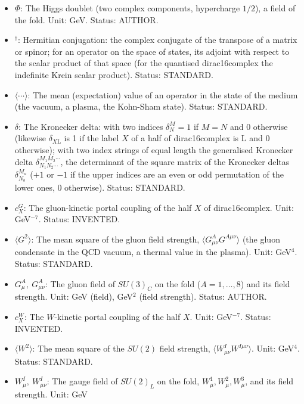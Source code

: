 \documentclass[
  10pt,
]{article}
\begin{document}
\begin{itemize}
  dirac16complex (the right-handed half has none). Unit: GeV\(^{-5}\).
  Status: INVENTED.
\item
  \(\Phi\): The Higgs doublet (two complex components, hypercharge
  \(1/2\)), a field of the fold. Unit: GeV. Status: AUTHOR.
\item
  \({}^\dagger\): Hermitian conjugation: the complex conjugate of the
  transpose of a matrix or spinor; for an operator on the space of
  states, its adjoint with respect to the scalar product of that space
  (for the quantised dirac16complex the indefinite Krein scalar
  product). Status: STANDARD.
\item
  \(\langle\cdots\rangle\): The mean (expectation) value of an operator
  in the state of the medium (the vacuum, a plasma, the Kohn-Sham
  state). Status: STANDARD.
\item
  \(\delta\): The Kronecker delta: with two indices \(\delta^M_N = 1\)
  if \(M = N\) and 0 otherwise (likewise \(\delta_{X\mathrm{L}}\) is 1
  if the label \(X\) of a half of dirac16complex is L and 0 otherwise);
  with two index strings of equal length the generalised Kronecker delta
  \(\delta^{M_1M_2\cdots}_{N_1N_2\cdots}\), the determinant of the
  square matrix of the Kronecker deltas \(\delta^{M_a}_{N_b}\) (\(+1\)
  or \(-1\) if the upper indices are an even or odd permutation of the
  lower ones, 0 otherwise). Status: STANDARD.
\item
  \(c^{G}_X\): The gluon-kinetic portal coupling of the half \(X\) of
  dirac16complex. Unit: GeV\(^{-7}\). Status: INVENTED.
\item
  \(\langle G^2\rangle\): The mean square of the gluon field strength,
  \(\langle G^A_{\mu\nu}G^{A\mu\nu}\rangle\) (the gluon condensate in
  the QCD vacuum, a thermal value in the plasma). Unit: GeV\(^4\).
  Status: STANDARD.
\item
  \(G^A_\mu,\ G^A_{\mu\nu}\): The gluon field of \(SU(3)_C\) on the fold
  (\(A = 1, \dots, 8\)) and its field strength. Unit: GeV (field),
  GeV\(^2\) (field strength). Status: AUTHOR.
\item
  \(c^{W}_X\): The \(W\)-kinetic portal coupling of the half \(X\).
  Unit: GeV\(^{-7}\). Status: INVENTED.
\item
  \(\langle W^2\rangle\): The mean square of the \(SU(2)\) field
  strength, \(\langle W^I_{\mu\nu}W^{I\mu\nu}\rangle\). Unit: GeV\(^4\).
  Status: STANDARD.
\item
  \(W^I_\mu,\ W^I_{\mu\nu}\): The gauge field of \(SU(2)_L\) on the
  fold, \(W^1_\mu, W^2_\mu, W^3_\mu\), and its field strength. Unit: GeV

\end{itemize}
\end{document}
